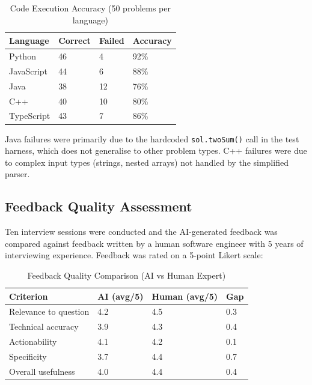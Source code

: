 \begin{table}[H]
\centering
\caption{Code Execution Accuracy (50 problems per language)}
\vspace{8pt}
\begin{tabularx}{\textwidth}{|X|C{2.5cm}|C{2.5cm}|C{2.5cm}|}
\hline
\textbf{Language} & \textbf{Correct} & \textbf{Failed} & \textbf{Accuracy} \\
\hline
Python & 46 & 4 & 92\% \\
\hline
JavaScript & 44 & 6 & 88\% \\
\hline
Java & 38 & 12 & 76\% \\
\hline
C++ & 40 & 10 & 80\% \\
\hline
TypeScript & 43 & 7 & 86\% \\
\hline
\end{tabularx}
\label{tab:codeaccuracy}
\end{table}

Java failures were primarily due to the hardcoded \texttt{sol.twoSum()} call in the test harness, which does not generalise to other problem types. C++ failures were due to complex input types (strings, nested arrays) not handled by the simplified parser.

\subsection{Feedback Quality Assessment}

Ten interview sessions were conducted and the AI-generated feedback was compared against feedback written by a human software engineer with 5 years of interviewing experience. Feedback was rated on a 5-point Likert scale:

\begin{table}[H]
\centering
\caption{Feedback Quality Comparison (AI vs Human Expert)}
\vspace{8pt}
\begin{tabularx}{\textwidth}{|X|C{2.5cm}|C{2.5cm}|C{1.8cm}|}
\hline
\textbf{Criterion} & \textbf{AI (avg/5)} & \textbf{Human (avg/5)} & \textbf{Gap} \\
\hline
Relevance to question & 4.2 & 4.5 & 0.3 \\
\hline
Technical accuracy & 3.9 & 4.3 & 0.4 \\
\hline
Actionability & 4.1 & 4.2 & 0.1 \\
\hline
Specificity & 3.7 & 4.4 & 0.7 \\
\hline
Overall usefulness & 4.0 & 4.4 & 0.4 \\
\hline
\end{tabularx}
\label{tab:feedbackquality}
\end{table}

